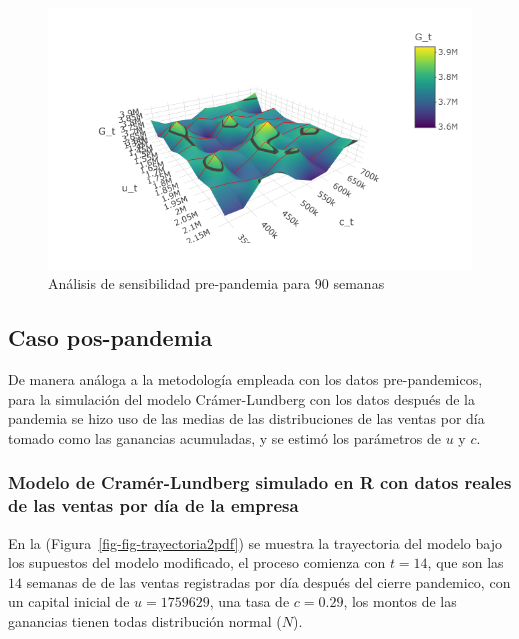 \documentclass[
  us-letterpaper,
]{scrreprt}
\theoremstyle{plain}
\theoremstyle{plain}
\theoremstyle{definition}
\theoremstyle{remark}
\begin{document}
\begin{figure}[H]

{\centering \includegraphics[width=5.20833in,height=\textheight]{fig-analisispdf.png}

}

\caption{Análisis de sensibilidad pre-pandemia para 90 semanas}

\end{figure}%

\subsection{Caso pos-pandemia}\label{caso-pos-pandemia}

De manera análoga a la metodología empleada con los datos
pre-pandemicos, para la simulación del modelo Crámer-Lundberg con los
datos después de la pandemia se hizo uso de las medias de las
distribuciones de las ventas por día tomado como las ganancias
acumuladas, y se estimó los parámetros de \(u\) y \(c\).

\subsubsection{Modelo de Cramér-Lundberg simulado en R con datos reales
de las ventas por día de la
empresa}\label{modelo-de-cramuxe9r-lundberg-simulado-en-r-con-datos-reales-de-las-ventas-por-duxeda-de-la-empresa}

En la (Figura~\ref{fig-fig-trayectoria2pdf}) se muestra la trayectoria
del modelo bajo los supuestos del modelo modificado, el proceso comienza
con \(t = 14\), que son las \(14\) semanas de de las ventas registradas
por día después del cierre pandemico, con un capital inicial de
\(u= 1759629\), una tasa de \(c= 0.29\), los montos de las ganancias
tienen todas distribución normal (\(N\)).
\end{document}
